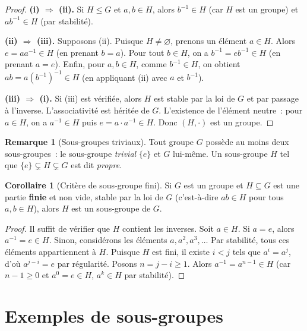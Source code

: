\documentclass[12pt,a4paper,openany]{book}
\theoremstyle{definition}
\newtheorem{corollaire}{Corollaire}[chapter]
\newtheorem{remarque}{Remarque}[chapter]
\begin{document}
\begin{proof}
\textbf{(i) $\Rightarrow$ (ii).} Si $H \leq G$ et $a, b \in H$, alors $b^{-1} \in H$
(car $H$ est un groupe) et $ab^{-1} \in H$ (par stabilité).

\textbf{(ii) $\Rightarrow$ (iii).} Supposons (ii). Puisque $H \neq \varnothing$,
prenons un élément $a \in H$. Alors $e = aa^{-1} \in H$ (en prenant $b = a$). Pour tout
$b \in H$, on a $b^{-1} = eb^{-1} \in H$ (en prenant $a = e$). Enfin, pour $a, b \in
H$, comme $b^{-1} \in H$, on obtient $ab = a(b^{-1})^{-1} \in H$ (en appliquant (ii)
avec $a$ et $b^{-1}$).

\textbf{(iii) $\Rightarrow$ (i).} Si (iii) est vérifiée, alors $H$ est stable par la
loi de $G$ et par passage à l'inverse. L'associativité est héritée de $G$. L'existence
de l'élément neutre~: pour $a \in H$, on a $a^{-1} \in H$ puis $e = a \cdot a^{-1} \in
H$. Donc $(H, \cdot)$ est un groupe.
\end{proof}

\begin{remarque}[Sous-groupes triviaux]
\label{rem:sg-triviaux}
Tout groupe $G$ possède au moins deux sous-groupes~: le sous-groupe \emph{trivial}
$\{e\}$ et $G$ lui-même. Un sous-groupe $H$ tel que $\{e\} \subsetneq H \subsetneq G$
est dit \emph{propre}.
\end{remarque}

\begin{corollaire}[Critère de sous-groupe fini]
\label{cor:critere-sg-fini}
Si $G$ est un groupe et $H \subseteq G$ est une partie \textbf{finie} et non vide,
stable par la loi de $G$ (c'est-à-dire $ab \in H$ pour tous $a, b \in H$), alors $H$
est un sous-groupe de $G$.
\end{corollaire}

\begin{proof}
Il suffit de vérifier que $H$ contient les inverses. Soit $a \in H$. Si $a = e$, alors
$a^{-1} = e \in H$. Sinon, considérons les éléments $a, a^2, a^3, \ldots$ Par stabilité,
tous ces éléments appartiennent à $H$. Puisque $H$ est fini, il existe $i < j$ tels que
$a^i = a^j$, d'où $a^{j-i} = e$ par régularité. Posons $n = j - i \geq 1$. Alors
$a^{-1} = a^{n-1} \in H$ (car $n - 1 \geq 0$ et $a^0 = e \in H$, $a^k \in H$ par
stabilité).
\end{proof}

\section{Exemples de sous-groupes}
\label{sec:ch2-exemples-sg}
\end{document}
